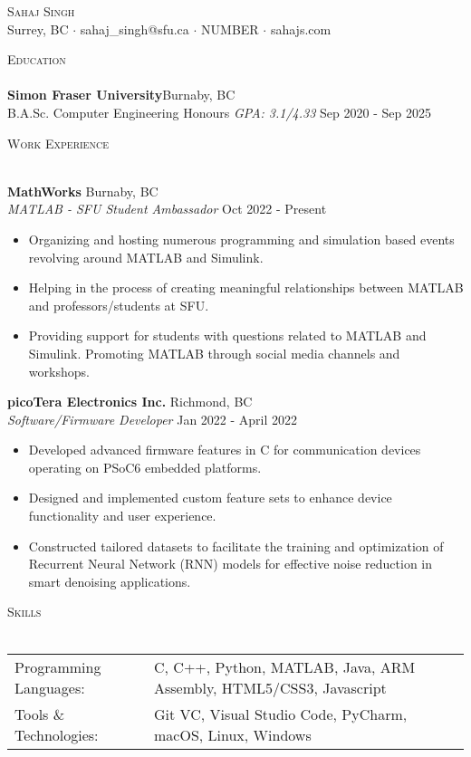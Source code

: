\documentclass[a4paper]{article}
\newcommand{\lineunder} {
    \vspace*{-8pt} \\
    \hspace*{-18pt} \hrulefill \\
}
\newcommand{\header} [1] {
    {\hspace*{-18pt}\vspace*{6pt} \textsc{#1}}
    \vspace*{-6pt} \lineunder
}
\begin{document}
\vspace*{-40pt}

    

\vspace*{-10pt}
\begin{center}
	{\Huge \scshape {Sahaj Singh}}\\
	Surrey, BC $\cdot$ sahaj\_singh@sfu.ca $\cdot$ NUMBER $\cdot$ sahajs.com\\
\end{center}

\header{Education}
\textbf{Simon Fraser University}\hfill Burnaby, BC\\
B.A.Sc. Computer Engineering Honours \textit{GPA: 3.1/4.33} \hfill Sep 2020 - Sep 2025\\
\vspace{2mm}

\header{Work Experience}
\vspace{1mm}

\textbf{MathWorks} \hfill Burnaby, BC\\
\textit{MATLAB - SFU Student Ambassador} \hfill Oct 2022 - Present\\
\vspace{-1mm}
\begin{itemize} \itemsep 1pt
	\item Organizing and hosting numerous programming and simulation based events revolving around MATLAB and Simulink.
	\item Helping in the process of creating meaningful relationships between MATLAB and professors/students at SFU.
	\item Providing support for students with questions related to MATLAB and Simulink. Promoting MATLAB through social media channels and workshops.
\end{itemize}
\textbf{picoTera Electronics Inc.} \hfill Richmond, BC\\
\textit{Software/Firmware Developer} \hfill Jan 2022 - April 2022\\
\vspace{-1mm}
\begin{itemize} \itemsep 1pt
	\item Developed advanced firmware features in C for communication devices operating on PSoC6 embedded platforms.
	\item Designed and implemented custom feature sets to enhance device functionality and user experience.
	\item Constructed tailored datasets to facilitate the training and optimization of Recurrent Neural Network (RNN) models for effective noise reduction in smart denoising applications.
\end{itemize}

\header{Skills}
\begin{tabular}{ l l }
	Programming Languages: & C, C++, Python, MATLAB, Java, ARM Assembly, HTML5/CSS3, Javascript \\
	Tools \& Technologies: & Git VC, Visual Studio Code, PyCharm, macOS, Linux, Windows         \\
\end{tabular}
\vspace{2mm}





\ 
\end{document}

